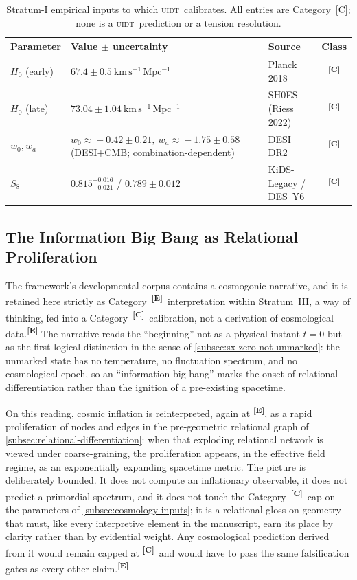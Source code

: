 \documentclass[12pt,a4paper,twoside]{article}
\theoremstyle{plain}
\theoremstyle{definition}
\theoremstyle{remark}
\newcommand{\UIDT}{\textsc{uidt}}
\newcommand{\catmark}[1]{\textsuperscript{\textsf{\textbf{[#1]}}}}
\begin{document}
\begin{table}[H]
\centering
\footnotesize
\caption{Stratum-I empirical inputs to which \UIDT\ calibrates. All entries are
Category~[C]; none is a \UIDT\ prediction or a tension resolution.}
\label{tab:cosmology-inputs}
\renewcommand{\arraystretch}{1.3}
\begin{tabular}{p{} p{} p{} c}
\toprule
\textbf{Parameter} & \textbf{Value $\pm$ uncertainty} & \textbf{Source} & \textbf{Class} \\
\midrule
$H_0$ (early) & $67.4 \pm 0.5\ \mathrm{km\,s^{-1}\,Mpc^{-1}}$ & Planck 2018 & \catmark{C} \\
$H_0$ (late) & $73.04 \pm 1.04\ \mathrm{km\,s^{-1}\,Mpc^{-1}}$ & SH0ES (Riess 2022) & \catmark{C} \\
$w_0, w_a$ & $w_0\!\approx\!-0.42\pm0.21,\ w_a\!\approx\!-1.75\pm0.58$ (DESI+CMB; combination-dependent) & DESI DR2 & \catmark{C} \\
$S_8$ & $0.815^{+0.016}_{-0.021}$ / $0.789\pm0.012$ & KiDS-Legacy / DES~Y6 & \catmark{C} \\
\bottomrule
\end{tabular}
\end{table}

\subsection{The Information Big Bang as Relational Proliferation}
\label{subsec:information-big-bang}

The framework's developmental corpus contains a cosmogonic narrative, and it is retained here strictly as Category~\catmark{E}\ interpretation within Stratum~III, a way of thinking, fed into a Category~\catmark{C}\ calibration, not a derivation of cosmological data.\catmark{E} The narrative reads the ``beginning'' not as a physical instant $t=0$ but as the first logical distinction in the sense of \cref{subsec:sx-zero-not-unmarked}: the unmarked state has no temperature, no fluctuation spectrum, and no cosmological epoch, so an ``information big bang'' marks the onset of relational differentiation rather than the ignition of a pre-existing spacetime.

On this reading, cosmic inflation is reinterpreted, again at \catmark{E}, as a rapid proliferation of nodes and edges in the pre-geometric relational graph of \cref{subsec:relational-differentiation}: when that exploding relational network is viewed under coarse-graining, the proliferation appears, in the effective field regime, as an exponentially expanding spacetime metric. The picture is deliberately bounded. It does not compute an inflationary observable, it does not predict a primordial spectrum, and it does not touch the Category~\catmark{C}\ cap on the parameters of \cref{subsec:cosmology-inputs}; it is a relational gloss on geometry that must, like every interpretive element in the manuscript, earn its place by clarity rather than by evidential weight. Any cosmological prediction derived from it would remain capped at \catmark{C}\ and would have to pass the same falsification gates as every other claim.\catmark{E}
\end{document}
